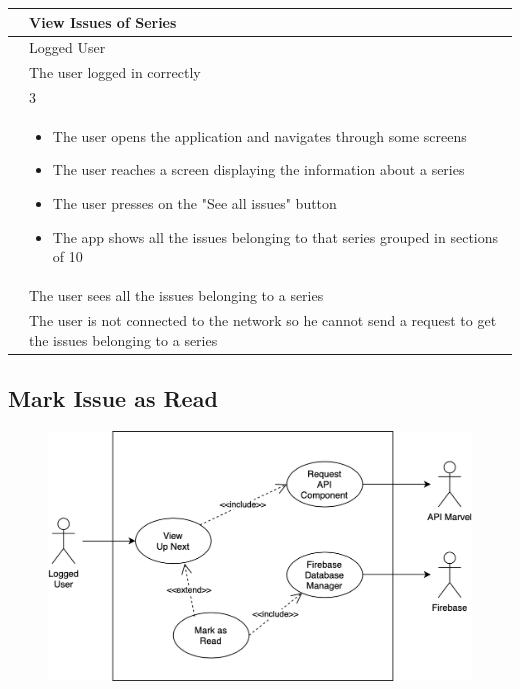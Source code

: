 {{{{{{\renewcommand{\arraystretch}{2}
{\begin{center}
\begin{tabular}{ | m{4cm} | m{9cm} | } 
 \hline
 {\centering{\textbf{Name}}} & View Issues of Series \\
 \hline
 {\centering{\textbf{Actor}}} & Logged User \\
 \hline
 {\centering{\textbf{Entry Condition}}} & The user logged in correctly \\
 \hline
 {\centering{\textbf{Goal}}} & 3 \\
 \hline
 {\centering{\textbf{Event flow}}} & \begin{itemize}[leftmargin=*]
 	\item The user opens the application and navigates through some screens
	\item The user reaches a screen displaying the information about a series
	\item The user presses on the "See all issues" button 
	\item The app shows all the issues belonging to that series grouped in sections of 10
	\end{itemize} \\	
 \hline
 {\centering{\textbf{Exit condition}}} & The user sees all the issues belonging to a series \\
 \hline
 {\centering{\textbf{Exceptions}}} & The user is not connected to the network so he cannot send a request to get the issues belonging to a series \\
 \hline
\end{tabular}
\end{center}}

\clearpage

\subsection{Mark Issue as Read}
\begin{figure}[h]
\centering
\includegraphics[width=\textwidth]{img/usecases/readissue}
\end{figure}

}}}}}}

